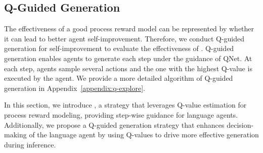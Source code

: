\subsection{Q-Guided Generation}
The effectiveness of a good process reward model can be represented by whether it can lead to better agent self-improvement. Therefore, we conduct Q-guided generation for self-improvement to evaluate the effectiveness of {\ours}. Q-guided generation enables agents to generate each step under the guidance of QNet. At each step, agents sample several actions and the one with the highest Q-value is executed by the agent. We provide a more detailed algorithm of Q-guided generation in Appendix~\ref{appendix:q-explore}.

In this section, we introduce {\ours}, a strategy that leverages Q-value estimation for process reward modeling, providing step-wise guidance for language agents. Additionally, we propose a Q-guided generation strategy that enhances decision-making of the language agent by using Q-values to drive more effective generation during inference. 
